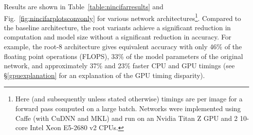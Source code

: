 \documentclass[thesis]{subfiles}
\begin{document}
	Results are shown in Table~\ref{table:nincifarresults} and Fig.~\ref{fig:nincifarplotsconvonly} for various network architectures\footnote{Here (and subsequently unless stated otherwise) timings are per image for a forward pass computed on a large batch. Networks were implemented using Caffe (with CuDNN and MKL) and run on an Nvidia Titan Z GPU and 2 10-core Intel Xeon E5-2680 v2 CPUs.}. Compared to the baseline architecture, the root variants achieve a significant reduction in computation and model size without a significant reduction in accuracy. For example, the root-8 architecture gives equivalent accuracy with only 46\% of the floating point operations (FLOPS), 33\% of the model parameters of the original network, and approximately 37\% and 23\% faster CPU and GPU timings (see \S\ref{gpuexplanation} for an explanation of the GPU timing disparity).
	
	\newcommand{\covarlabels}[5]{%
		\begin{tikzpicture}[anchor=south west]
		\node [inner sep=0pt] (c)
		{
			#5
		};
		\ifx\covarwidth\undefined
		\newlength{\covarwidth}
		\newlength{\covarheight}
		\fi
		\settowidth{\covarwidth}{#5}
		\settoheight{\covarheight}{#5}
		\path[use as bounding box] (c.south west) rectangle (c.north east);
		\node [anchor=south west, xshift=-0.5em, yshift=-0.5em, rotate=45] at (c.north west) {\footnotesize 0};
		\node [anchor=south east, xshift=\covarwidth, yshift=-0.2em] at (c.north west) {\footnotesize #4};
		\node [anchor=south west, xshift=0.25em, yshift=-1.05\covarheight, rotate=90] at (c.north west) {\footnotesize #2};
		\node [anchor=south, xshift=0.5\covarwidth] at (c.north west) {\footnotesize\texttt{#3}};
		\node [anchor=south, xshift=0.2em, yshift=-0.5\covarheight, rotate=90] at (c.north west) {\footnotesize \texttt{#1}};
		\end{tikzpicture}%
	}
	
\end{document}
